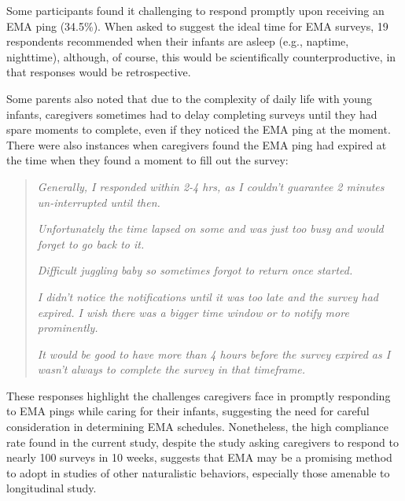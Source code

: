 \documentclass[
]{article}
\begin{document}
Some participants found it challenging to respond promptly upon
receiving an EMA ping (34.5\%). When asked to suggest the ideal time for
EMA surveys, 19 respondents recommended when their infants are asleep
(e.g., naptime, nighttime), although, of course, this would be
scientifically counterproductive, in that responses would be
retrospective.

Some parents also noted that due to the complexity of daily life with
young infants, caregivers sometimes had to delay completing surveys
until they had spare moments to complete, even if they noticed the EMA
ping at the moment. There were also instances when caregivers found the
EMA ping had expired at the time when they found a moment to fill out
the survey:

\begin{quote}
\textit{Generally, I responded within 2-4 hrs, as I couldn't guarantee 2 minutes un-interrupted until then.}
  
\textit{Unfortunately the time lapsed on some and was just too busy and would forget to go back to it.}
  
\textit{Difficult juggling baby so sometimes forgot to return once started.}
  
\textit{I didn’t notice the notifications until it was too late and the survey had expired. I wish there was a bigger time window or to notify more prominently.}
  
\textit{It would be good to have more than 4 hours before the survey expired as I wasn't always to complete the survey in that timeframe.}
  
\end{quote}

These responses highlight the challenges caregivers face in promptly
responding to EMA pings while caring for their infants, suggesting the
need for careful consideration in determining EMA schedules.
Nonetheless, the high compliance rate found in the current study,
despite the study asking caregivers to respond to nearly 100 surveys in
10 weeks, suggests that EMA may be a promising method to adopt in
studies of other naturalistic behaviors, especially those amenable to
longitudinal study.
\end{document}
